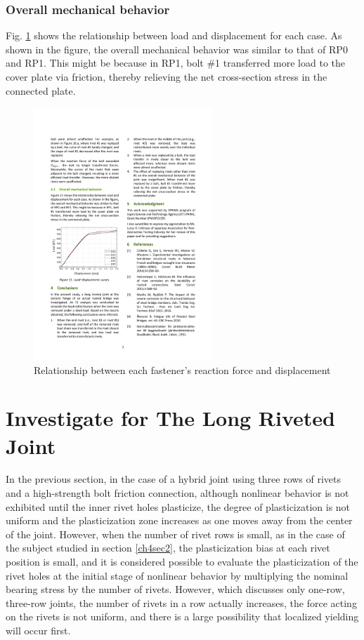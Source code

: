 \subsubsection{Overall mechanical behavior}

Fig. \ref{fig-l11} shows the relationship between load and displacement for each case. As shown in the figure, the overall mechanical behavior was similar to that of RP0 and RP1. This might be because in RP1, bolt \#1 transferred more load to the cover plate via friction, thereby relieving the net cross-section stress in the connected plate.

\begin{figure}[htbp]
    \centering
    \includegraphics[width=0.6\textwidth]{imgs/ch4/fig-l11.pdf}
    \caption{Relationship between each fastener’s reaction force and displacement}
    \label{fig-l11}
\end{figure}

\section{Investigate for The Long Riveted Joint}

In the previous section, in the case of a hybrid joint using three rows of rivets and a high-strength bolt friction connection, although nonlinear behavior is not exhibited until the inner rivet holes plasticize, the degree of plasticization is not uniform and the plasticization zone increases as one moves away from the center of the joint. However, when the number of rivet rows is small, as in the case of the subject studied in section \ref{ch4sec2}, the plasticization bias at each rivet position is small, and it is considered possible to evaluate the plasticization of the rivet holes at the initial stage of nonlinear behavior by multiplying the nominal bearing stress by the number of rivets. However, which discusses only one-row, three-row joints, the number of rivets in a row actually increases, the force acting on the rivets is not uniform, and there is a large possibility that localized yielding will occur first.

